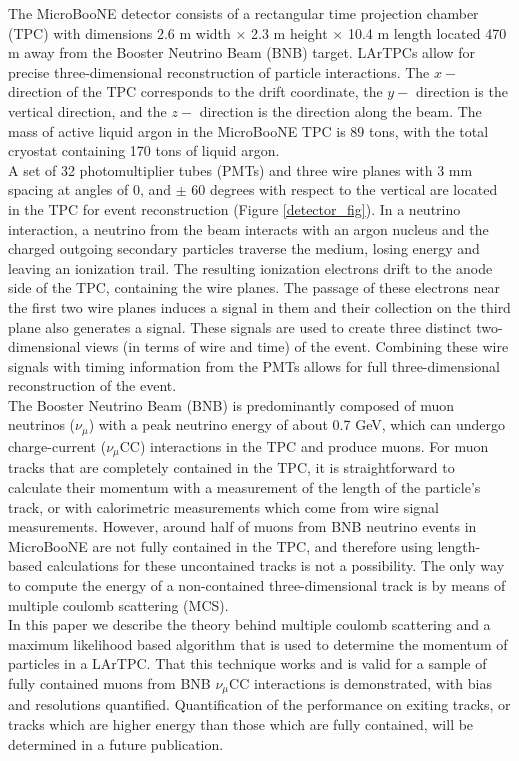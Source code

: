 \documentclass[a4paper,11pt]{article}
\begin{document}
The MicroBooNE detector\cite{ub_detectorpaper} consists of a rectangular time projection chamber (TPC) with dimensions 2.6 m width $\times$ 2.3 m height $\times$ 10.4 m length located 470 m away from the Booster Neutrino Beam (BNB) target. LArTPCs allow for precise three-dimensional reconstruction of particle interactions. The $x-$ direction of the TPC corresponds to the drift coordinate, the $y-$ direction is the vertical direction, and the $z-$ direction is the direction along the beam. The mass of active liquid argon in the MicroBooNE TPC is 89 tons, with the total cryostat containing 170 tons of liquid argon.\\

A set of 32 photomultiplier tubes (PMTs) and three wire planes with 3 mm spacing at angles of 0, and $\pm$ 60 degrees with respect to the vertical are located in the TPC for event reconstruction (Figure \ref{detector_fig}). In a neutrino interaction, a neutrino from the beam interacts with an argon nucleus and the charged outgoing secondary particles traverse the medium, losing energy and leaving an ionization trail. The resulting ionization electrons drift to the anode side of the TPC, containing the wire planes. The passage of these electrons near the first two wire planes induces a signal in them and their collection on the third plane also generates a signal. These signals are used to create three distinct two-dimensional views (in terms of wire and time) of the event. Combining these wire signals with timing information from the PMTs allows for full three-dimensional reconstruction of the event.\\

The Booster Neutrino Beam (BNB) is predominantly composed of muon neutrinos ($\nu_\mu$) with a peak neutrino energy of about 0.7 GeV, which can undergo charge-current ($\nu_\mu$CC) interactions in the TPC and produce muons. For muon tracks that are completely contained in the TPC, it is straightforward to calculate their momentum with a measurement of the length of the particle's track, or with calorimetric measurements which come from wire signal measurements. However, around half of muons from BNB neutrino events in MicroBooNE are not fully contained in the TPC, and therefore using length-based calculations for these uncontained tracks is not a possibility. The only way to compute the energy of a non-contained three-dimensional track is by means of multiple coulomb scattering (MCS). \\

In this paper we describe the theory behind multiple coulomb scattering and a maximum likelihood based algorithm that is used to determine the momentum of particles in a LArTPC. That this technique works and is valid for a sample of fully contained muons from BNB $\nu_\mu$CC interactions is demonstrated, with bias and resolutions quantified. Quantification of the performance on exiting tracks, or tracks which are higher energy than those which are fully contained, will be determined in a future publication.
\end{document}
